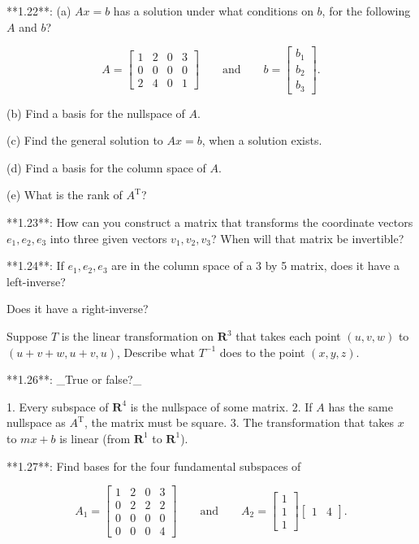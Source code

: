 

**1.22**: (a) \(Ax=b\) has a solution under what conditions on \(b\), for the following \(A\) and \(b\)?

\[A=\begin{bmatrix}1&2&0&3\\ 0&0&0&0\\ 2&4&0&1\end{bmatrix}\qquad\text{and}\qquad b=\begin{bmatrix}b_{1}\\ b_{2}\\ b_{3}\end{bmatrix}.\]

(b) Find a basis for the nullspace of \(A\).

(c) Find the general solution to \(Ax=b\), when a solution exists.

(d) Find a basis for the column space of \(A\).

(e) What is the rank of \(A^{\mathrm{T}}\)?

**1.23**: How can you construct a matrix that transforms the coordinate vectors \(e_{1},e_{2},e_{3}\) into three given vectors \(v_{1},v_{2},v_{3}\)? When will that matrix be invertible?

**1.24**: If \(e_{1},e_{2},e_{3}\) are in the column space of a 3 by 5 matrix, does it have a left-inverse?

Does it have a right-inverse?

Suppose \(T\) is the linear transformation on \(\mathbf{R}^{3}\) that takes each point \((u,v,w)\) to \((u+v+w,u+v,u)\), Describe what \(T^{-1}\) does to the point \((x,y,z)\).

**1.26**: _True or false?_

1. Every subspace of \(\mathbf{R}^{4}\) is the nullspace of some matrix.
2. If \(A\) has the same nullspace as \(A^{\mathrm{T}}\), the matrix must be square.
3. The transformation that takes \(x\) to \(mx+b\) is linear (from \(\mathbf{R}^{1}\) to \(\mathbf{R}^{1}\)).

**1.27**: Find bases for the four fundamental subspaces of

\[A_{1}=\begin{bmatrix}1&2&0&3\\ 0&2&2&2\\ 0&0&0&0\\ 0&0&0&4\end{bmatrix}\qquad\text{and}\qquad A_{2}=\begin{bmatrix}1\\ 1\\ 1\end{bmatrix}\begin{bmatrix}1&4\end{bmatrix}.\]


